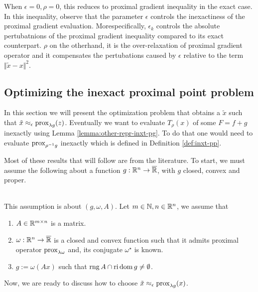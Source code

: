 \documentclass[12pt]{article}
\DeclareMathOperator{\rng}{\mathop{rng}}
\begin{document}
        \begin{remark}
            When $\epsilon = 0, \rho = 0$, this reduces to proximal gradient inequality in the exact case. 
            In this inequality, observe that the parameter $\epsilon$ controls the inexactiness of the proximal gradient evaluation. 
            Morespecifically, $\epsilon_k$ controls the absolute pertubatnions of the proximal gradient inequality compared to its exact counterpart. 
            $\rho$ on the otherhand, it is the over-relaxation of proximal gradient operator and it compensates the pertubations caused by $\epsilon$ relative to the term $\Vert \tilde x - x\Vert^2$. 
        \end{remark}
    \subsection{Optimizing the inexact proximal point problem}
        In this section we will present the optimization problem that obtains a $\tilde x$ such that $\tilde x \approx_\epsilon \operatorname{prox}_{\lambda g}(z)$. 
        Eventually we want to evaluate $T_{\rho}(x)$ of some $F = f + g$ inexactly using Lemma \ref{lemma:other-repr-inxt-pg}. 
        To do that one would need to evaluate $\operatorname{prox}_{\rho^{-1}g}$ inexactly which is defined in Definition \ref{def:inxt-pp}. 
        \par
        Most of these results that will follow are from the literature. 
        To start, we must assume the following about a function $g: \mathbb R^n \rightarrow \overline {\mathbb R}$, with $g$ closed, convex and proper. 
        \begin{assumption}\;\label{ass:for-inxt-prox}\\
            This assumption is about $(g, \omega, A)$. 
            Let $m \in \mathbb N, n \in \mathbb R^n$, we assume that 
            \begin{enumerate}[nosep]
                \item $A\in \mathbb R^{m \times n}$ is a matrix. 
                \item $\omega: \mathbb R^n \rightarrow \overline {\mathbb R}$ is a closed and convex function such that it admits proximal operator $\operatorname{prox}_{\lambda\omega}$ and, its conjugate $\omega^\star$ is known. 
                \item $g := \omega(Ax)$ such that $\rng A \cap \reli\dom g \neq\emptyset$. 
            \end{enumerate}
        \end{assumption}
        Now, we are ready to discuss how to choose $\tilde x \approx_\epsilon \operatorname{prox}_{\lambda g}(x)$. 
\end{document}
